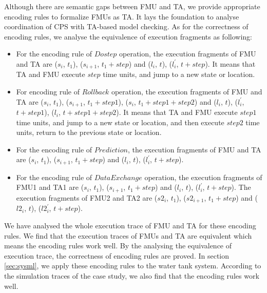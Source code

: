 Although there are semantic gaps between FMU and TA, we provide appropriate encoding rules to formalize FMUs as TA. It lays the foundation to analyse coordination of CPS with TA-based model checking. 
As for the correctness of encoding rules, we analyse the equivalence of execution fragments as following:
\begin{itemize}
\item
For the encoding rule of $Dostep$ operation, the execution fragments of FMU and TA are ($s_{i}$, $t_{1}$), ($s_{i+1}$, $t_{1}+step$) and ($l_{i}$, $t$), ($l_{i}^{\prime}$, $t+step$). It means that TA and FMU execute $step$ time units, and jump to a new state or location.
\item 
For encoding rule of $Rollback$ operation, the execution fragments of FMU and TA are ($s_{i}$, $t_{1}$), ($s_{i+1}$, $t_{1}+step1$), ($s_{i}$, $t_{1}+step1+step2$) and ($l_{i}$, $t$), ($l_{i}^{\prime}$, $t+step1$), ($l_{i}$, $t+step1+step2$). It means that TA and FMU execute $step1$ time units, and jump to a new state or location, and then execute $step2$ time units, return to the previous state or location. 
\item
For the encoding rule of $Prediction$, the execution fragments of FMU and TA are ($s_{i}$, $t_{1}$), ($s_{i+1}$, $t_{1}+step$) and ($l_{i}$, $t$), ($l_{i}^{\prime}$, $t+step$). 
\item
For the encoding rule of $Data Exchange$ operation, the execution fragments of FMU1 and TA1 are ($s_{i}$, $t_{1}$), ($s_{i+1}$, $t_{1}+step$) and ($l_{i}$, $t$), ($l_{i}^{\prime}$, $t+step$). The execution fragments of FMU2 and TA2 are ($s2_{i}$, $t_{1}$), ($s2_{i+1}$, $t_{1}+step$) and ($l2_{i}$, $t$), ($l2_{i}^{\prime}$, $t+step$). 
\end{itemize}
We have analysed the whole execution trace of FMU and TA for these encoding rules. We find that the execution traces of FMUs and TA are equivalent which means the encoding rules work well. By the analysing the equivalence of execution trace, the correctness of encoding rules are proved. In section \ref{sec:sysml}, we apply these encoding rules to the water tank system. According to the simulation traces of the case study, we also find that the encoding rules work well.